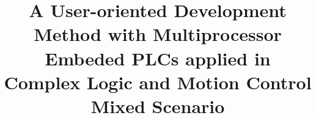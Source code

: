 \documentclass[journal,UTF8]{IEEEtran}
\begin{document}
%
\title{A User-oriented Development Method with Multiprocessor Embeded PLCs applied in Complex Logic and Motion Control Mixed Scenario}
%
%
%


%
%
\end{document}
